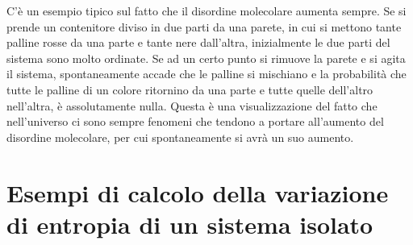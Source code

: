 \documentclass[10pt,a4paper]{book}
\begin{document}
\begin{figure}[htpb]
\end{figure}
\FloatBarrier
C'è un esempio tipico sul fatto che il disordine molecolare aumenta sempre. Se si prende un contenitore diviso in due parti da una parete, in cui si mettono tante palline rosse da una parte e tante nere dall'altra, inizialmente le due parti del sistema sono molto ordinate. Se ad un certo punto si rimuove la parete e si agita il sistema, spontaneamente accade che le palline si mischiano e la probabilità che tutte le palline di un colore ritornino da una parte e tutte quelle dell'altro nell'altra, è assolutamente nulla. Questa è una visualizzazione del fatto che nell'universo ci sono sempre fenomeni che tendono a portare all'aumento del disordine molecolare, per cui spontaneamente si avrà un suo aumento.







































\section{Esempi di calcolo della variazione di entropia di un sistema isolato}
\end{document}
